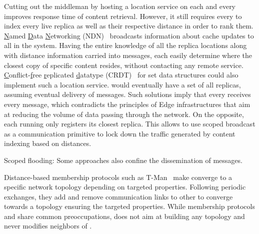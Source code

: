 \begin{asparadesc}
Cutting out the middleman by hosting a location service on each and
every \process improves response time of content retrieval. However,
it still requires every \process to index every live replica as well
as their respective distance in order to rank them.
\underline{N}amed \underline{D}ata \underline{N}etworking
(NDN)~\cite{nlsr} broadcasts information about cache updates to all
\nodes in the system. Having the entire knowledge of all the replica
locations along with distance information carried into messages, each
\node easily determine where the closest copy of specific content
resides, without contacting any remote
service. \underline{C}onflict-\underline{f}ree \underline{r}eplicated
\underline{d}atatype (CRDT)~\cite{shapiro2011crdts} for set data
structures could also implement such a location service. \Processes
would eventually have a set of all replicas, assuming eventual
delivery of messages.
\noindent Such solutions imply that every \process receives every
message, which contradicts the principles of Edge infrastructures that
aim at reducing the volume of data passing through the network. On the
opposite, each \process running \NAME only registers its closest
replica. This allows \NAME to use scoped broadcast as a communication
primitive to lock down the traffic generated by content indexing based
on distances.

\item [Scoped flooding:]
  Some approaches also confine the dissemination of messages.

\noindent Distance-based membership protocols such as
T-Man~\cite{t-man} make \processes converge to a specific network
topology depending on targeted properties. Following periodic
exchanges, they add and remove communication links to other \processes
to converge towards a topology ensuring the targeted properties.
While membership protocols and \NAME share common preoccupations,
\NAME does not aim at building any topology and never modifies
neighbors of \processes.



\end{asparadesc}
